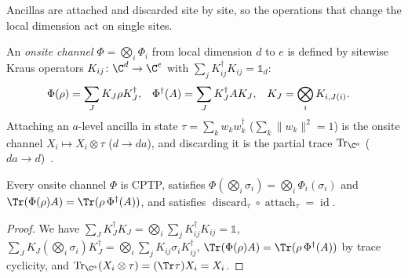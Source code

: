 Ancillas are attached and discarded site by site, so the operations that
change the local dimension act on single sites.

\begin{definition}
    \label{def:qc_onsite_channel}
    \leanok
    An \emph{onsite channel} $\Phi=\bigotimes_i\Phi_i$ from local dimension $d$ to $e$ is defined by sitewise Kraus operators $K_{ij}\colon\C^d\to\C^e$ with $\sum_j K_{ij}^\dagger K_{ij}=\mathbb 1_d$:
    \begin{align}
        \Phi(\rho)      & =\sum_J K_J\rho K_J^\dagger,    &
        \Phi^\dagger(A) & =\sum_J K_J^\dagger AK_J,       &
        K_J             & =\bigotimes_i K_{i,J(i)}.\notag
    \end{align}
    Attaching an $a$-level ancilla in state $\tau=\sum_k w_k w_k^\dagger$ ($\sum_k\|w_k\|^2=1$) is the onsite channel $X_i\mapsto X_i\otimes\tau$ ($d\to da$), and discarding it is the partial trace $\operatorname{Tr}_{\C^a}$ ($da\to d$)~\cite{Piroli2021LOCC}.
\end{definition}

\begin{lemma}
    \label{lem:qc_onsite_channel_properties}
    \leanok
    Every onsite channel $\Phi$ is CPTP, satisfies $\Phi(\bigotimes_i\sigma_i)=\bigotimes_i\Phi_i(\sigma_i)$ and $\Tr(\Phi(\rho)A)=\Tr(\rho\,\Phi^\dagger(A))$, and satisfies $\operatorname{discard}_\tau\circ\operatorname{attach}_\tau=\operatorname{id}$.
\end{lemma}
\begin{proof}
    \leanok
    We have $\sum_J K_J^\dagger K_J=\bigotimes_i\sum_j K_{ij}^\dagger K_{ij}=\mathbb 1$, $\sum_J K_J(\bigotimes_i\sigma_i)K_J^\dagger=\bigotimes_i\sum_j K_{ij}\sigma_i K_{ij}^\dagger$, $\Tr(\Phi(\rho)A)=\Tr(\rho\,\Phi^\dagger(A))$ by trace cyclicity, and $\operatorname{Tr}_{\C^a}(X_i\otimes\tau)=(\Tr\tau)X_i=X_i$.
\end{proof}

